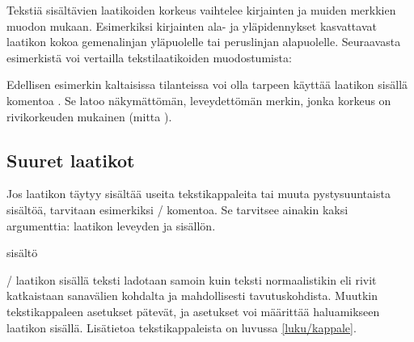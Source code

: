 Tekstiä sisältävien laatikoiden korkeus vaihtelee kirjainten ja muiden
merkkien muodon mukaan. Esimerkiksi kirjainten ala- ja yläpidennykset
kasvattavat laatikon kokoa gemenalinjan yläpuolelle tai peruslinjan
alapuolelle. Seuraavasta esimerkistä voi vertailla tekstilaatikoiden
muodostumista:

\begin{koodilohkosis}
\setlength{\fboxsep}{0bp}
  
\end{koodilohkosis}

\begin{tulossis}
  \setlength{\fboxsep}{0bp}
    
\end{tulossis}

\noindent
Edellisen esimerkin kaltaisissa tilanteissa voi olla tarpeen käyttää
laatikon sisällä komentoa . Se latoo näkymättömän,
leveydettömän merkin, jonka korkeus on rivikorkeuden mukainen (mitta
).

\begin{koodilohkosis}
\setlength{\fboxsep}{0bp}
  
\end{koodilohkosis}

\begin{tulossis}
  \setlength{\fboxsep}{0bp}
    
\end{tulossis}

\subsection{Suuret laatikot}
\label{luku/laatikot-isot}

Jos laatikon täytyy sisältää useita tekstikappaleita tai muuta
pystysuuntaista sisältöä, tarvitaan esimerkiksi \-/
komentoa. Se tarvitsee ainakin kaksi argumenttia: laatikon leveyden ja
sisällön.

\begin{koodilohkosis}
\parbox{leveys}{sisältö}
\end{koodilohkosis}

\noindent
{}\-/ laatikon sisällä teksti ladotaan samoin kuin teksti
normaalistikin eli rivit katkaistaan sanavälien kohdalta ja
mahdollisesti tavutuskohdista. Muutkin tekstikappaleen asetukset
pätevät, ja asetukset voi määrittää haluamikseen laatikon sisällä.
Lisätietoa tekstikappaleista on luvussa \ref{luku/kappale}.

